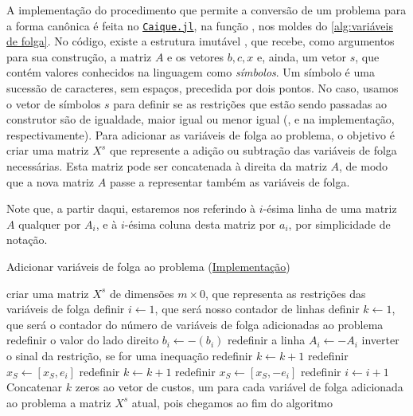 A implementação do procedimento que permite a conversão de um problema para a forma canônica é feita no \href{https://github.com/phcentenaro7/Caique.jl}{\texttt{Caique.jl}}, na função 
\href{https://github.com/phcentenaro7/Caique.jl/blob/9c78027f1884181846a6321a5640f92c9a718ce4/src/LinearProgram.jl#L41}{}, nos moldes do \cref{alg:variáveis de folga}. No código, existe a estrutura imutável \href{https://github.com/phcentenaro7/Caique.jl/blob/main/src/LinearProgram.jl}{}, que recebe, como argumentos para sua construção, a matriz $ A$ e os vetores $b, c, x$ e, ainda, um vetor $s$, que contém valores conhecidos na linguagem como \emph{símbolos}. Um símbolo é uma sucessão de caracteres, sem espaços, precedida por dois pontos. No caso, usamos o vetor de símbolos $s$ para definir se as restrições que estão sendo passadas ao construtor são de igualdade, maior igual ou menor igual (,  e  na implementação, respectivamente). Para adicionar as variáveis de folga ao problema, o objetivo é criar uma matriz $ X^s$ que represente a adição ou subtração das variáveis de folga necessárias. Esta matriz pode ser concatenada à direita da matriz $ A$, de modo que a nova matriz $ A$ passe a representar também as variáveis de folga.

Note que, a partir daqui, estaremos nos referindo à $i$-ésima linha de uma matriz $A$ qualquer por $ A_i$, e à $i$-ésima coluna desta matriz por $a_i$, por simplicidade de notação.

\begin{algorithm}
\begin{algorithmic}[1]
\caption{Adicionar variáveis de folga ao problema (\href{https://github.com/phcentenaro7/Caique.jl/blob/9c78027f1884181846a6321a5640f92c9a718ce4/src/LinearProgram.jl\#L41}{Implementação})}\label{alg:variáveis de folga}
\State criar uma matriz $ X^s$ de dimensões $m\times0$, que representa as restrições das variáveis de folga
\State definir $i \gets 1$, que será nosso contador de linhas
\State definir $k \gets 1$, que será o contador do número de variáveis de folga adicionadas ao problema
        \State redefinir o valor do lado direito $ b_i \gets -( b_i)$
        \State redefinir a linha $A_i \gets -A_i$
        \State inverter o sinal da restrição, se for uma inequação
    \EndIf
        \State redefinir $k \gets k + 1$
        \State redefinir $x_S \gets [x_S, e_i]$
        \State redefinir $k \gets k + 1$
        \State redefinir $x_S \gets [x_S, -e_i]$
\EndIf
\State redefinir $i \gets i + 1$
\EndWhile
\State Concatenar $k$ zeros ao vetor de custos, um para cada variável de folga adicionada ao problema
\State \Return a matriz $ X^s$ atual, pois chegamos ao fim do algoritmo
\end{algorithmic}
\end{algorithm}

